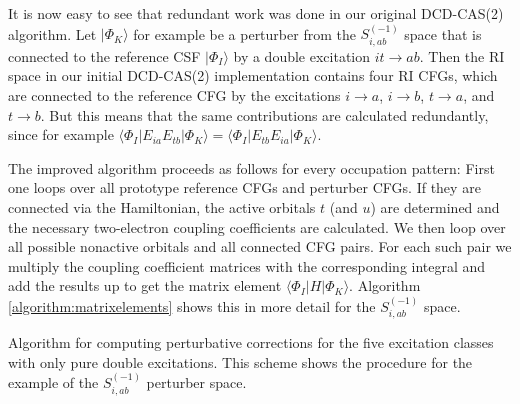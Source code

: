 It is now easy to see that redundant work was done in our original DCD-CAS(2) algorithm. Let $|\Phi_K\rangle$ for example be a perturber from the $S_{i, ab}^{(-1)}$ space that is connected to the reference CSF $|\Phi_I\rangle$ by a double excitation $it\rightarrow ab$. Then the RI space in our initial DCD-CAS(2) implementation contains four RI CFGs, which are connected to the reference CFG by the excitations $i\rightarrow a$, $i\rightarrow b$, $t\rightarrow a$, and $t\rightarrow b$. But this means that the same contributions are calculated redundantly, since for example $\langle \Phi_I|E_{ia}E_{tb}|\Phi_K\rangle = \langle \Phi_I|E_{tb}E_{ia}|\Phi_K\rangle$.

The improved algorithm proceeds as follows for every occupation pattern: First one loops over all prototype reference CFGs and perturber CFGs. If they are connected
via the Hamiltonian, the active orbitals $t$ (and $u$) are determined and the necessary two-electron coupling coefficients are calculated. We then loop over
all possible nonactive orbitals and all connected CFG pairs. For each such pair we multiply the coupling coefficient matrices with the corresponding integral
and add the results up to get the matrix element $\langle \Phi_I | H | \Phi_K \rangle$. Algorithm \ref{algorithm:matrixelements} shows this in more detail for the $S_{i, ab}^{(-1)}$ space.
\begin{algorithm}
  \caption{Algorithm for computing perturbative corrections for the five excitation classes with only pure double excitations. This scheme shows the procedure for the example of the $S_{i, ab}^{(-1)}$ perturber space.}
  \label{algorithm:matrixelements}
  \begin{algorithmic}[1]
        \EndIf
      \EndFor
    \EndFor
          \EndFor
        \EndFor
      \EndFor
    \EndFor
  \end{algorithmic}
  
\end{algorithm}
